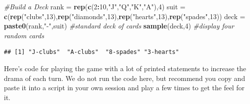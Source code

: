 \documentclass[
]{book}
\newenvironment{Shaded}{\begin{snugshade}}{\end{snugshade}}
\newcommand{\CommentTok}[1]{\textcolor[rgb]{0.56,0.35,0.01}{\textit{#1}}}
\newcommand{\DecValTok}[1]{\textcolor[rgb]{0.00,0.00,0.81}{#1}}
\newcommand{\FunctionTok}[1]{\textcolor[rgb]{0.13,0.29,0.53}{\textbf{#1}}}
\newcommand{\NormalTok}[1]{#1}
\newcommand{\OtherTok}[1]{\textcolor[rgb]{0.56,0.35,0.01}{#1}}
\newcommand{\SpecialCharTok}[1]{\textcolor[rgb]{0.81,0.36,0.00}{\textbf{#1}}}
\newcommand{\StringTok}[1]{\textcolor[rgb]{0.31,0.60,0.02}{#1}}
\theoremstyle{definition}
\theoremstyle{definition}
\theoremstyle{definition}
\theoremstyle{definition}
\theoremstyle{remark}
\begin{document}
\begin{Shaded}
\begin{Highlighting}[]
\CommentTok{\#Build a Deck }
\NormalTok{rank }\OtherTok{=} \FunctionTok{rep}\NormalTok{(}\FunctionTok{c}\NormalTok{(}\DecValTok{2}\SpecialCharTok{:}\DecValTok{10}\NormalTok{,}\StringTok{"J"}\NormalTok{,}\StringTok{"Q"}\NormalTok{,}\StringTok{"K"}\NormalTok{,}\StringTok{"A"}\NormalTok{),}\DecValTok{4}\NormalTok{)}
\NormalTok{suit }\OtherTok{=} \FunctionTok{c}\NormalTok{(}\FunctionTok{rep}\NormalTok{(}\StringTok{"clubs"}\NormalTok{,}\DecValTok{13}\NormalTok{),}\FunctionTok{rep}\NormalTok{(}\StringTok{"diamonds"}\NormalTok{,}\DecValTok{13}\NormalTok{),}\FunctionTok{rep}\NormalTok{(}\StringTok{"hearts"}\NormalTok{,}\DecValTok{13}\NormalTok{),}\FunctionTok{rep}\NormalTok{(}\StringTok{"spades"}\NormalTok{,}\DecValTok{13}\NormalTok{))}
\NormalTok{deck }\OtherTok{=} \FunctionTok{paste0}\NormalTok{(rank,}\StringTok{"{-}"}\NormalTok{,suit) }\CommentTok{\#standard deck of cards}
\FunctionTok{sample}\NormalTok{(deck,}\DecValTok{4}\NormalTok{) }\CommentTok{\#display four random cards}
\end{Highlighting}
\end{Shaded}

\begin{verbatim}
## [1] "J-clubs"  "A-clubs"  "8-spades" "3-hearts"
\end{verbatim}

Here's code for playing the game with a lot of printed statements to increase the drama of each turn. We do not run the code here, but recommend you copy and paste it into a script in your own session and play a few times to get the feel for it.
\end{document}
